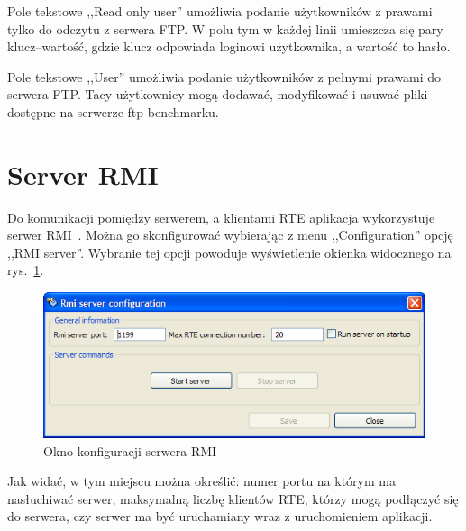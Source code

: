 Pole tekstowe ,,Read only user'' umożliwia podanie użytkowników z prawami tylko do odczytu z serwera FTP.
W polu tym w każdej linii umieszcza się pary klucz--wartość, gdzie klucz odpowiada loginowi użytkownika,
a wartość to hasło. 

Pole tekstowe ,,User'' umożliwia podanie użytkowników z pełnymi prawami do serwera FTP. Tacy użytkownicy
mogą dodawać, modyfikować i usuwać pliki dostępne na serwerze ftp benchmarku.

\section{Server RMI}\label{sect:rmiserver}
Do komunikacji pomiędzy serwerem, a klientami RTE aplikacja wykorzystuje serwer
RMI~\cite{RMI1}. Można go skonfigurować wybierając z menu ,,Configuration'' opcję ,,RMI server''. 
Wybranie tej opcji powoduje wyświetlenie okienka widocznego na rys.~\ref{rys:rmiwindow}.
\begin{figure}[h]
\begin{center}
\includegraphics[width=0.70\linewidth]{figures/gui/04.png}
\end{center}
\caption{Okno konfiguracji serwera RMI}\label{rys:rmiwindow}
\end{figure}
Jak widać, w tym miejscu można określić: numer portu na którym ma nasłuchiwać serwer,
maksymalną liczbę klientów RTE, którzy mogą podłączyć się do serwera, czy serwer ma być
uruchamiany wraz z uruchomieniem aplikacji.

